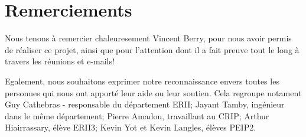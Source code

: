 \chapter{Remerciements}
Nous tenons à remercier chaleuresement Vincent Berry, pour nous avoir permis de 
réaliser ce projet, ainsi que pour l'attention dont il a fait preuve tout le long
à travers les réunions et e-mails!

Egalement, nous souhaitons exprimer notre reconnaissance envers toutes les 
personnes qui nous ont apporté leur aide ou leur soutien. Cela regroupe notament
Guy Cathebras - responsable du département ERII; Jayant Tamby, ingénieur dans le
même département; Pierre Amadou, travaillant au CRIP; Arthur Hiairrassary, élève 
ERII3; Kevin Yot et Kevin Langles, élèves PEIP2.


